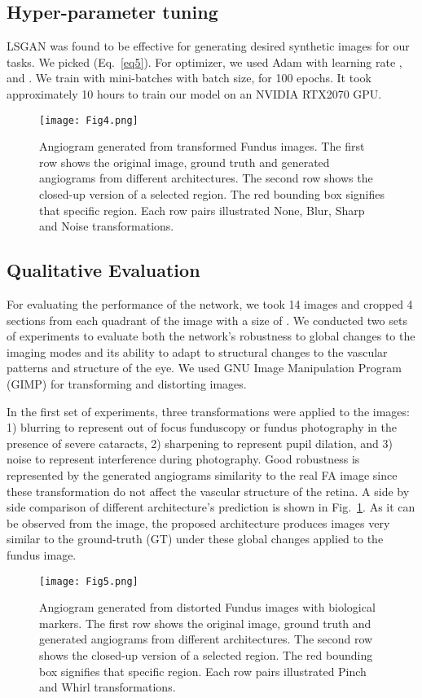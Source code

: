 \documentclass[runningheads]{llncs}
\begin{document}
\subsection{Hyper-parameter tuning}
\label{subsec:hyper}
LSGAN \cite{mao2017least} was found to be effective for generating desired synthetic images for our tasks. We picked  (Eq.~\ref{eq5}). For optimizer, we used Adam with learning rate ,  and . We train with mini-batches with batch size,  for 100 epochs. It took approximately 10 hours to train our model on an NVIDIA RTX2070 GPU.
\begin{figure}[h!t]
    \centering
    \texttt{[image: Fig4.png]}
    \caption{Angiogram generated from transformed Fundus images. The first row shows the original image, ground truth and generated angiograms from different architectures. The second row shows the closed-up version of a selected region. The red bounding box signifies that specific region. Each row pairs illustrated None, Blur, Sharp and Noise transformations.}
    \label{fig4}
\end{figure}
\subsection{Qualitative Evaluation}
\label{subsec:quant}
For evaluating the performance of the network, we took 14 images and cropped 4 sections from each quadrant of the image with a size of . We conducted two sets of experiments to evaluate both the network's robustness to global changes to the imaging modes and its ability to adapt to structural changes to the vascular patterns and structure of the eye. We used GNU Image Manipulation Program (GIMP) \cite{gimp2019gimp} for transforming and distorting images.
 
In the first set of experiments, three transformations were applied to the images: 1) blurring to represent out of focus funduscopy or fundus photography in the presence of severe cataracts, 2) sharpening to represent pupil dilation, and 3) noise to represent interference during photography. Good robustness is represented by the generated angiograms similarity to the real FA image since these transformation do not affect the vascular structure of the retina. A side by side comparison of different architecture's prediction is shown in Fig.~\ref{fig4}. As it can be observed from the image, the proposed architecture produces images very similar to the ground-truth (GT) under these global changes applied to the fundus image. 
\begin{figure}[t]
    \centering
    \texttt{[image: Fig5.png]}
    \caption{Angiogram generated from distorted Fundus images with biological markers. The first row shows the original image, ground truth and generated angiograms from different architectures. The second row shows the closed-up version of a selected region. The red bounding box signifies that specific region. Each row pairs illustrated Pinch and Whirl transformations.}
    \label{fig5}
\end{figure}
\end{document}
